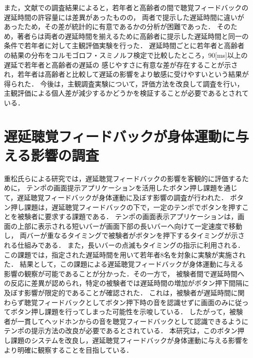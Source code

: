 また，文献\cite{shigematu-toukyoushibu}での調査結果によると，若年者と高齢者の間で聴覚フィードバックの遅延時間の許容量には差異があったものの，
両者で提示した遅延時間に違いがあったため，その差が統計的に有意であるかの分析が困難であった．
そのため，著者らは両者の遅延時間を揃えるために高齢者に提示した遅延時間と同一の条件で若年者に対して主観評価実験を行った．
遅延時間ごとに若年者と高齢者の結果の分布をコルモゴロフ・スミノルフ検定で比較したところ，90[ms]以上の遅延で若年者と高齢者の遅延の
感じやすさに有意な差が存在することが示され，若年者は高齢者と比較して遅延の影響をより敏感に受けやすいという結果が得られた．
今後は，主観調査実験について，評価方法を改良して調査を行い，主観評価による個人差が減少するかどうかを検証することが必要であるとされている．
\section{遅延聴覚フィードバックが身体運動に与える影響の調査}
重松氏らによる研究\cite{shigematu}では，遅延聴覚フィードバックの影響を客観的に評価するために，
テンポの画面提示アプリケーション\cite{Syuuronn-shigematu}を活用したボタン押し課題を通じて，遅延聴覚フィードバックが身体運動に及ぼす影響の調査が行われた．
ボタン押し課題は，遅延聴覚フィードバックの下で，一定のテンポでボタンを押すことを被験者に要求する課題である．
テンポの画面表示アプリケーションは，画面の上部に表示される短いバーが画面下部の長いバーへ向けて一定速度で移動し，
両バーが重なるタイミングで被験者がボタンを押下するタイミングが示される仕組みである．
また，長いバーの点滅もタイミングの指示に利用される．
この課題では，指定された遅延時間を用いて若年者8名を対象に実験が実施された．
結果として，この課題による遅延聴覚フィードバックが身体運動に与える影響の観察が可能であることが分かった．その一方で，
被験者間で遅延時間への反応に差異が認められ，特定の被験者では遅延時間の増加がボタン押下間隔に及ぼす影響が限定的であることが確認された．
これは，被験者が遅延時間に関わらず聴覚フィードバックとしてボタン押下時の音を認識せずに画面のみに従ってボタン押し課題を行ってしまった可能性を示唆している．
したがって，被験者が一貫してヘッドホンからの音を聴覚フィードバックとして認識できるようにテンポの提示方法の改良が必要であるとされている．
本研究は，このボタン押し課題のシステムを改良し，遅延聴覚フィードバックが身体運動に与える影響をより明確に観察することを目指している．
